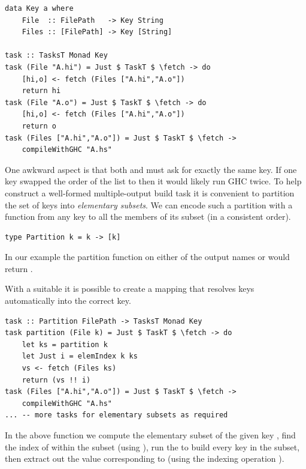 \vspace{1mm}
\begin{verbatim}
data Key a where
    File  :: FilePath   -> Key String
    Files :: [FilePath] -> Key [String]

task :: TasksT Monad Key
task (File "A.hi") = Just $ TaskT $ \fetch -> do
    [hi,o] <- fetch (Files ["A.hi","A.o"])
    return hi
task (File "A.o") = Just $ TaskT $ \fetch -> do
    [hi,o] <- fetch (Files ["A.hi","A.o"])
    return o
task (Files ["A.hi","A.o"]) = Just $ TaskT $ \fetch ->
    compileWithGHC "A.hs"
\end{verbatim}
\vspace{1mm}

One awkward aspect is that both  and  must ask for
exactly the same  key. If one  key swapped the order of the
list to  then it would likely run GHC twice. To help construct a
well-formed multiple-output build task it is convenient to partition the set of
keys into \emph{elementary subsets}. We can encode such a partition with a
function from any key to all the members of its subset (in a consistent order).

\vspace{1mm}
\begin{verbatim}
type Partition k = k -> [k]
\end{verbatim}
\vspace{1mm}

\noindent
In our example the partition function on either of the output names 
or  would return \hs{["A.hi","A.o"]}.

With a suitable  it is possible to create a mapping that resolves
 keys automatically into the correct  key.

\vspace{1mm}
\begin{verbatim}
task :: Partition FilePath -> TasksT Monad Key
task partition (File k) = Just $ TaskT $ \fetch -> do
    let ks = partition k
    let Just i = elemIndex k ks
    vs <- fetch (Files ks)
    return (vs !! i)
task (Files ["A.hi","A.o"]) = Just $ TaskT $ \fetch ->
    compileWithGHC "A.hs"
... -- more tasks for elementary subsets as required
\end{verbatim}
\vspace{1mm}

In the above function we compute the elementary subset  of the given key
, find the index of  within the subset (using ), run
the  to build every key in the subset, then extract out the value
corresponding to  (using the indexing operation \hs{!!}).

